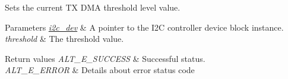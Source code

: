 Sets the current TX D\+MA threshold level value.


\begin{DoxyParams}{Parameters}
{\em \mbox{\hyperlink{structi2c__dev}{i2c\+\_\+dev}}} & A pointer to the I2C controller device block instance.\\
\hline
{\em threshold} & The threshold value.\\
\hline
\end{DoxyParams}

\begin{DoxyRetVals}{Return values}
{\em A\+L\+T\+\_\+\+E\+\_\+\+S\+U\+C\+C\+E\+SS} & Successful status. \\
\hline
{\em A\+L\+T\+\_\+\+E\+\_\+\+E\+R\+R\+OR} & Details about error status code \\
\hline
\end{DoxyRetVals}
